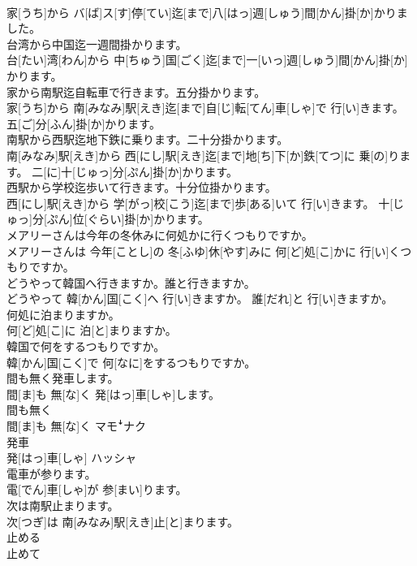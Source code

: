 \documentclass[8pt]{extreport}
\begin{document}
\begin{CJK}{UTF8}{min}
\\	家[うち]から バ[ば]ス[す]停[てい]迄[まで]八[はっ]週[しゅう]間[かん]掛[か]かりました。
\\	台湾から中国迄一週間掛かります。	
\\	台[たい]湾[わん]から 中[ちゅう]国[ごく]迄[まで]一[いっ]週[しゅう]間[かん]掛[か]かります。
\\	家から南駅迄自転車で行きます。五分掛かります。	
\\	家[うち]から 南[みなみ]駅[えき]迄[まで]自[じ]転[てん]車[しゃ]で 行[い]きます。 五[ご]分[ふん]掛[か]かります。
\\	南駅から西駅迄地下鉄に乗ります。二十分掛かります。	
\\	南[みなみ]駅[えき]から 西[にし]駅[えき]迄[まで]地[ち]下[か]鉄[てつ]に 乗[の]ります。 二[に]十[じゅっ]分[ぷん]掛[か]かります。
\\	西駅から学校迄歩いて行きます。十分位掛かります。	
\\	西[にし]駅[えき]から 学[がっ]校[こう]迄[まで]歩[ある]いて 行[い]きます。 十[じゅっ]分[ぷん]位[ぐらい]掛[か]かります。
\\	メアリーさんは今年の冬休みに何処かに行くつもりですか。	
\\	メアリーさんは 今年[ことし]の 冬[ふゆ]休[やす]みに 何[ど]処[こ]かに 行[い]くつもりですか。
\\	どうやって韓国へ行きますか。誰と行きますか。	
\\	どうやって 韓[かん]国[こく]へ 行[い]きますか。 誰[だれ]と 行[い]きますか。
\\	何処に泊まりますか。	
\\	何[ど]処[こ]に 泊[と]まりますか。
\\	韓国で何をするつもりですか。	
\\	韓[かん]国[こく]で 何[なに]をするつもりですか。
\\	間も無く発車します。	
\\	間[ま]も 無[な]く 発[はっ]車[しゃ]します。
\\	間も無く	
\\	間[ま]も 無[な]く	マモꜜナク
\\	発車	
\\	発[はっ]車[しゃ]	ハッシャ
\\	電車が参ります。	
\\	電[でん]車[しゃ]が 参[まい]ります。
\\	次は南駅止まります。	
\\	次[つぎ]は 南[みなみ]駅[えき]止[と]まります。
\\	止める 
\\	止めて 

\end{CJK}
\end{document}
